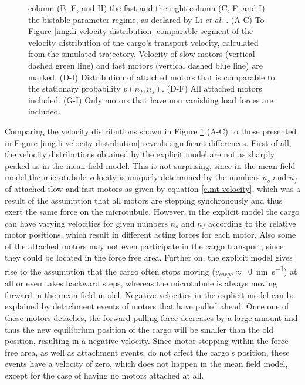 \begin{figure}
{column (B, E, and H) the fast and the right column (C, F, and I) the bistable parameter regime, as declared by Li \textit{et al.} \cite{li}. (A-C) To Figure \ref{img.li-velocity-distribution} comparable
segment of the velocity distribution of the cargo's transport velocity, calculated from the simulated trajectory. Velocity of slow motors (vertical dashed green line) and fast motors (vertical dashed blue line) are marked. (D-I)
Distribution of attached motors that is comparable to the stationary probability \mbox{$p\left(n_f, n_s\right)$}. (D-F) All attached motors included. (G-I) Only motors that have non vanishing
load forces are included.}
\label{img.sim-velocity/motor-distribution-for-larson-param}
\end{figure}
\renewcommand{\thesubfigure}{\alph{subfigure}}

Comparing the velocity distributions shown in Figure \ref{img.sim-velocity/motor-distribution-for-larson-param} (A-C) to those presented in Figure \ref{img.li-velocity-distribution} reveals significant
differences. First of all, the velocity distributions obtained by the explicit model are not as sharply peaked as in the mean-field model. This is not surprising, since in the mean-field
model the microtubule velocity is uniquely determined by the numbers $n_s$ and $n_f$ of attached slow and fast motors as given by equation \eqref{e.mt-velocity}, which was a result of the assumption
that all motors are stepping synchronously and thus exert the same force on the microtubule. However, in the explicit model the cargo can have varying velocities for given numbers $n_s$ and $n_f$
according to the relative motor positions, which result in different acting forces for each motor. Also some of the attached motors may not even participate in the cargo transport, since they could
be located in the force free area. Further on, the explicit model gives rise to the assumption that the cargo often stops moving (\mbox{$v_{cargo} \approx$ \SI{0}{\nano\metre\per\second}}) at all or
even takes backward steps, whereas the microtubule is always moving forward in the mean-field model. Negative velocities in the explicit model can be explained by detachment events of motors that have
pulled ahead. Once one of those motors detaches, the forward pulling force decreases by a large amount and thus the new equilibrium position of the cargo will be smaller than the old position,
resulting in a negative velocity. Since motor stepping within the force free area, as well as attachment events, do not affect the cargo's position, these events have a velocity of zero, which does
not happen in the mean field model, except for the case of having no motors attached at all.

